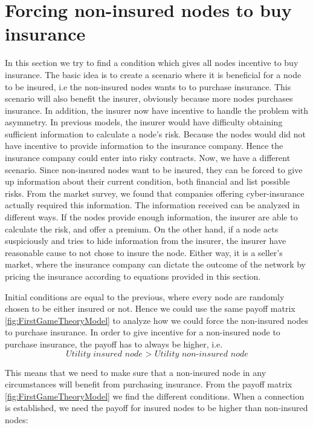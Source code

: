 \section{Forcing non-insured nodes to buy insurance}

In this section we try to find a condition which gives all nodes incentive to buy insurance. The basic idea is to create a scenario where it is beneficial for a node to be insured, i.e the non-insured nodes wants to to purchase insurance. 
This scenario will also benefit the insurer, obviously because more nodes purchases insurance. In addition, the insurer now have incentive to handle the problem with asymmetry. In previous models, the insurer would have difficulty obtaining sufficient information to calculate a node's risk. Because the nodes would did not have incentive to provide information to the insurance company. Hence the insurance company could enter into risky contracts. Now, we have a different scenario. Since non-insured nodes want to be insured, they can be forced to give up information about their current condition, both financial and list possible risks. From the market survey, we found that companies offering cyber-insurance actually required this information. The information received can be analyzed in different ways. If the nodes provide enough information, the insurer are able to calculate the risk, and offer a premium. On the other hand, if a node acts suspiciously and tries to hide information from the insurer, the insurer have reasonable cause to not chose to insure the node. Either way, it is a seller's market, where the insurance company can dictate the outcome of the network by pricing the insurance according to equations provided in this section.  

Initial conditions are equal to the previous, where every node are randomly chosen to be either insured or not. Hence we could use the same payoff matrix \ref{fig:FirstGameTheoryModel} to analyze how we could force the non-insured nodes to purchase insurance. In order to give incentive for a non-insured node to purchase insurance, the payoff has to always be higher, i.e. 
\begin{equation}
\textit{Utility insured node > Utility non-insured node}
\end{equation}



This means that we need to make sure that a non-insured node in any circumstances will benefit from purchasing insurance. From the payoff matrix \ref{fig:FirstGameTheoryModel} we find the different conditions. When a connection is established, we need the payoff for insured nodes to be higher than non-insured nodes: 


